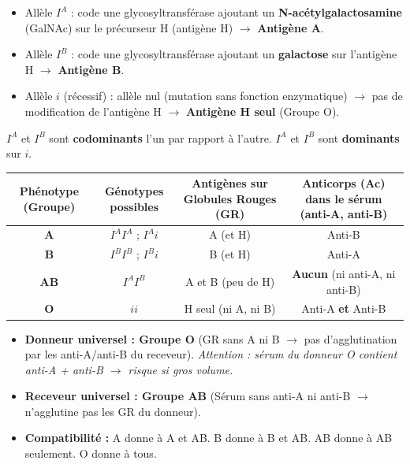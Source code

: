 \documentclass[11pt]{article}
\begin{document}
\begin{propriete}
\begin{itemize}
    \item Allèle $I^A$ : code une glycosyltransférase ajoutant un \textbf{N-acétylgalactosamine} (GalNAc) sur le précurseur H (antigène H) $\rightarrow$ \textbf{Antigène A}.
    \item Allèle $I^B$ : code une glycosyltransférase ajoutant un \textbf{galactose} sur l'antigène H $\rightarrow$ \textbf{Antigène B}.
    \item Allèle $i$ (récessif) : allèle nul (mutation sans fonction enzymatique) $\rightarrow$ pas de modification de l'antigène H $\rightarrow$ \textbf{Antigène H seul} (Groupe O).
\end{itemize}
$I^A$ et $I^B$ sont \textbf{codominants} l'un par rapport à l'autre. $I^A$ et $I^B$ sont \textbf{dominants} sur $i$.
\end{propriete}

\begin{center}
\begin{tabular}{|c|c|c|c|}
\hline
\rowcolor{popblueL}
\textbf{Phénotype (Groupe)} & \textbf{Génotypes possibles} & \textbf{Antigènes sur Globules Rouges (GR)} & \textbf{Anticorps (Ac) dans le sérum (anti-A, anti-B)} \\
\hline
\textbf{A} & $I^A I^A$ ; $I^A i$ & A (et H) & Anti-B \\
\hline
\textbf{B} & $I^B I^B$ ; $I^B i$ & B (et H) & Anti-A \\
\hline
\textbf{AB} & $I^A I^B$ & A et B (peu de H) & \textbf{Aucun} (ni anti-A, ni anti-B) \\
\hline
\textbf{O} & $i i$ & H seul (ni A, ni B) & Anti-A \textbf{et} Anti-B \\
\hline
\end{tabular}
\end{center}

\begin{attention}
\begin{itemize}
    \item \textbf{Donneur universel : Groupe O} (GR sans A ni B $\rightarrow$ pas d'agglutination par les anti-A/anti-B du receveur). \emph{Attention : sérum du donneur O contient anti-A + anti-B $\rightarrow$ risque si gros volume.}
    \item \textbf{Receveur universel : Groupe AB} (Sérum sans anti-A ni anti-B $\rightarrow$ n'agglutine pas les GR du donneur).
    \item \textbf{Compatibilité :} A donne à A et AB. B donne à B et AB. AB donne à AB seulement. O donne à tous.
\end{itemize}
\end{attention}
\end{document}
